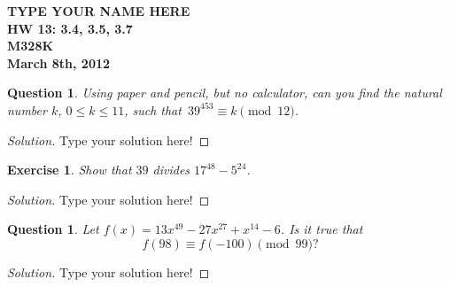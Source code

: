 \documentclass[12pt,leqno]{article}
\numberwithin{equation}{section}
\newtheorem{exer}[thm]{Exercise}
\newtheorem{ques}[thm]{Question}
\theoremstyle{definition}
\begin{document}
\thispagestyle{plain}
\begin{flushright}
\large{\textbf{TYPE YOUR NAME HERE \\
HW 13: 3.4, 3.5, 3.7\\
M328K \\
March 8th, 2012 \\}}
\end{flushright}

\markboth{}{} \setcounter{section}{0} \baselineskip=18pt

\setcounter{tocdepth}{4}



\setcounter{section}{3}

\setcounter{thm}{3}

\begin{ques}
Using paper and pencil, but no calculator, can you find the natural
number $k$, $0 \leq k \leq 11$, such that~$39^{453} \equiv k
\pmod{12}$.
\end{ques}

\begin{proof}[Solution]
Type your solution here!
\end{proof}

\begin{exer}
Show that $39$ divides $17^{48}-5^{24}$.
\end{exer}

\begin{proof}[Solution]
Type your solution here!
\end{proof}

\setcounter{thm}{6}

\begin{ques}
Let $f(x) = 13x^{49} - 27x^{27} + x^{14} - 6$.  Is it true that
\[f(98) \equiv f(-100) \pmod{99}?\]
\end{ques}

\begin{proof}[Solution]
Type your solution here!
\end{proof}
\end{document}
